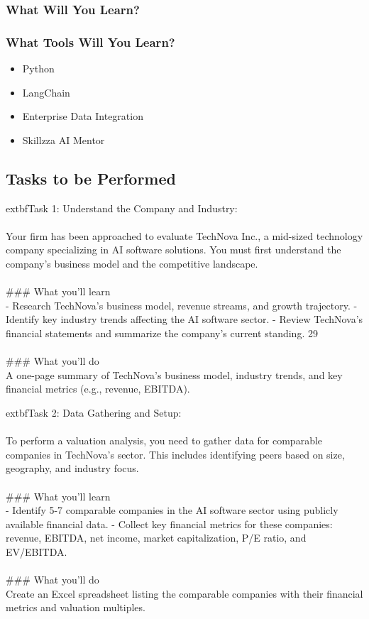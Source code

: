 \documentclass{article}
\begin{document}
\subsubsection*{What Will You Learn?}
\begin{itemize}
\end{itemize}

\subsubsection*{What Tools Will You Learn?}
\begin{itemize}
    \item Python
    \item LangChain
    \item Enterprise Data Integration
    \item Skillzza AI Mentor
\end{itemize}

\subsection*{Tasks to be Performed}
	extbf{Task 1:} Understand the Company and Industry:  \\
 \\
 Your firm has been approached to evaluate TechNova Inc., a mid-sized technology company specializing in AI software solutions. You must first understand the company’s business model and the competitive landscape. \\
 \\
### What you'll learn \\
- Research TechNova’s business model, revenue streams, and growth trajectory. - Identify key industry trends affecting the AI software sector. - Review TechNova’s financial statements and summarize the company’s current standing. 29 \\
 \\
### What you'll do \\
A one-page summary of TechNova’s business model, industry trends, and key financial metrics (e.g., revenue, EBITDA).

	extbf{Task 2:} Data Gathering and Setup:  \\
 \\
 To perform a valuation analysis, you need to gather data for comparable companies in TechNova’s sector. This includes identifying peers based on size, geography, and industry focus. \\
 \\
### What you'll learn \\
- Identify 5-7 comparable companies in the AI software sector using publicly available financial data. - Collect key financial metrics for these companies: revenue, EBITDA, net income, market capitalization, P/E ratio, and EV/EBITDA. \\
 \\
### What you'll do \\
Create an Excel spreadsheet listing the comparable companies with their financial metrics and valuation multiples.
\end{document}
